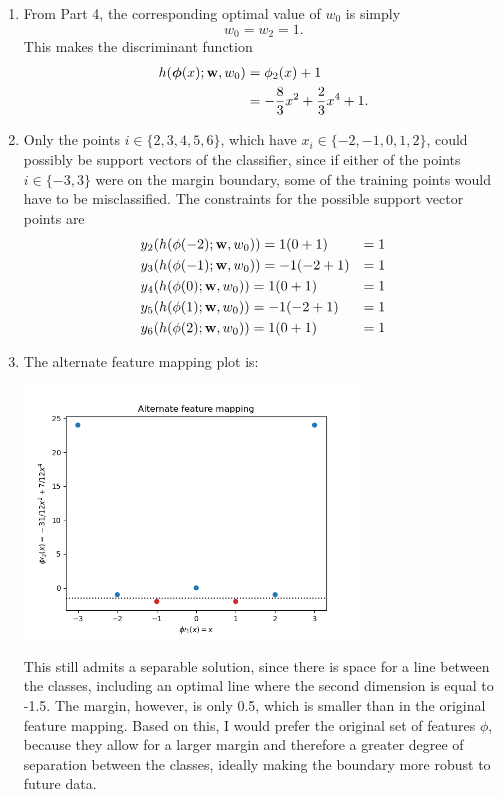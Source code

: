 \documentclass[submit]{harvardml}
\begin{document}
\begin{enumerate}
	\item From Part 4, the corresponding optimal value of $w_0$ is simply
	$$w_0 = w_2 = 1.$$
	This makes the discriminant function
	\begin{align*}
		h(\boldsymbol{\phi}(x);\mathbf{w},w_0) &= \phi_2(x) + 1 \\
		&= -\frac{8}{3}x^2 + \frac{2}{3}x^4 + 1.
	\end{align*}

	\item Only the points $i \in \{2, 3, 4, 5, 6\}$, which have $x_i \in \{-2, -1, 0, 1, 2\}$, could possibly be support vectors of the classifier, since if either of the points $i \in \{-3, 3\}$ were on the margin boundary, some of the training points would have to be misclassified. The constraints for the possible support vector points are
	\begin{align*}
		&y_2(h(\phi(-2); \mathbf{w}, w_0)) = 1(0 + 1) &= 1 \\
		&y_3(h(\phi(-1); \mathbf{w}, w_0)) = -1(-2 + 1) &= 1 \\
		&y_4(h(\phi(0); \mathbf{w}, w_0)) = 1(0 + 1) &= 1 \\
		&y_5(h(\phi(1); \mathbf{w}, w_0)) = -1(-2 + 1) &= 1 \\
		&y_6(h(\phi(2); \mathbf{w}, w_0)) = 1(0 + 1) &= 1
	\end{align*}
	
	\item The alternate feature mapping plot is:
	\begin{center}
	\includegraphics[width=0.7\textwidth]{svm_alt}
	\end{center}
	This still admits a separable solution, since there is space for a line between the classes, including an optimal line where the second dimension is equal to -1.5. The margin, however, is only 0.5, which is smaller than in the original feature mapping. Based on this, I would prefer the original set of features $\phi$, because they allow for a larger margin and therefore a greater degree of separation between the classes, ideally making the boundary more robust to future data.
\end{enumerate}
\end{document}
